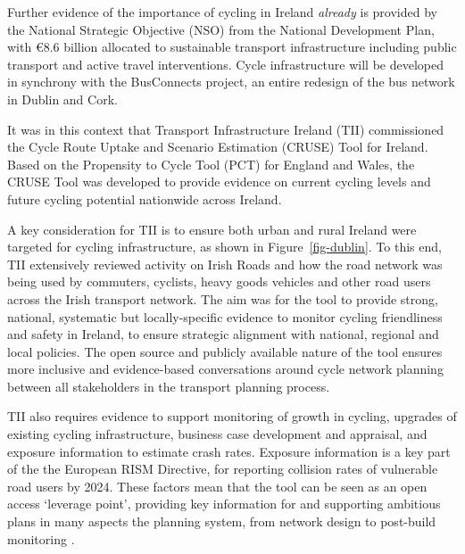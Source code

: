 \documentclass[
  super,
  preprint,
  3p]{elsarticle}
\begin{document}
Further evidence of the importance of cycling in Ireland \emph{already}
is provided by the National Strategic Objective (NSO) from the National
Development Plan, with €8.6 billion allocated to sustainable transport
infrastructure including public transport and active travel
interventions. Cycle infrastructure will be developed in synchrony with
the BusConnects project, an entire redesign of the bus network in Dublin
and Cork.

It was in this context that Transport Infrastructure Ireland (TII)
commissioned the Cycle Route Uptake and Scenario Estimation (CRUSE) Tool
for Ireland. Based on the Propensity to Cycle Tool (PCT) for England and
Wales, the CRUSE Tool was developed to provide evidence on current
cycling levels and future cycling potential nationwide across Ireland.

A key consideration for TII is to ensure both urban and rural Ireland
were targeted for cycling infrastructure, as shown in
Figure~\ref{fig-dublin}. To this end, TII extensively reviewed activity
on Irish Roads and how the road network was being used by commuters,
cyclists, heavy goods vehicles and other road users across the Irish
transport network. The aim was for the tool to provide strong, national,
systematic but locally-specific evidence to monitor cycling friendliness
and safety in Ireland, to ensure strategic alignment with national,
regional and local policies. The open source and publicly available
nature of the tool ensures more inclusive and evidence-based
conversations around cycle network planning between all stakeholders in
the transport planning process.

TII also requires evidence to support monitoring of growth in cycling,
upgrades of existing cycling infrastructure, business case development
and appraisal, and exposure information to estimate crash rates.
Exposure information is a key part of the the European RISM Directive,
for reporting collision rates of vulnerable road users by 2024. These
factors mean that the tool can be seen as an open access `leverage
point', providing key information for and supporting ambitious plans in
many aspects the planning system, from network design to post-build
monitoring \citep{lovelace2020}.
\end{document}
